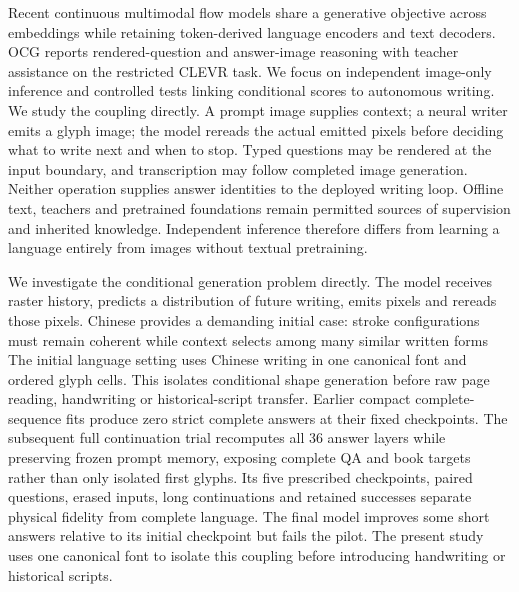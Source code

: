 \documentclass[12pt,a4paper]{article}
\providecommand{\DIFadd}[1]{{\protect\color{blue} \sf #1}} %
\providecommand{\DIFdel}[1]{{\protect\color{red} \scriptsize #1}} %
\providecommand{\DIFaddbegin}{} %
\providecommand{\DIFaddend}{} %
\providecommand{\DIFdelbegin}{} %
\providecommand{\DIFdelend}{} %
\begin{document}
\DIFdelbegin \DIFdel{Recent continuous multimodal flow models share a generative objective across
embeddings while retaining token-derived language encoders and text
decoders\cite{multimodalflow}. OCG reports rendered-question and answer-image
reasoning with teacher assistance on the restricted CLEVR task\cite{ocg}.
We focus on independent image-only inference and controlled tests linking
conditional scores to autonomous writing.
}\DIFdelend \DIFaddbegin \DIFadd{We study the coupling directly. A prompt image supplies context; a neural
writer emits a glyph image; the model rereads the actual emitted pixels before
deciding what to write next and when to stop. Typed questions may be rendered
at the input boundary, and transcription may follow completed image generation.
Neither operation supplies answer identities to the deployed writing loop.
Offline text, teachers and pretrained foundations remain permitted sources of
supervision and inherited knowledge. Independent inference therefore differs
from learning a language entirely from images without textual pretraining.
}\DIFaddend

\DIFdelbegin \DIFdel{We investigate the conditional generation problem directly. The model
receives raster history, predicts a distribution of future writing, emits
pixels and rereads those pixels. Chinese provides a demanding initial case:
stroke configurations must remain coherent while context selects among many
similar written forms}\DIFdelend \DIFaddbegin \DIFadd{The initial language setting uses Chinese writing in one canonical font and
ordered glyph cells. This isolates conditional shape generation before raw
page reading, handwriting or historical-script transfer. Earlier compact
complete-sequence fits produce zero strict complete answers at their fixed
checkpoints. The subsequent full continuation trial recomputes all 36 answer
layers while preserving frozen prompt memory, exposing complete QA and book
targets rather than only isolated first glyphs. Its five prescribed checkpoints,
paired questions, erased inputs, long continuations and retained successes
separate physical fidelity from complete language. The final model improves
some short answers relative to its initial checkpoint but fails the pilot}\DIFaddend .
\DIFdelbegin \DIFdel{The present study uses one canonical font to isolate
this coupling before introducing handwriting or historical scripts. }\DIFdelend
\end{document}
